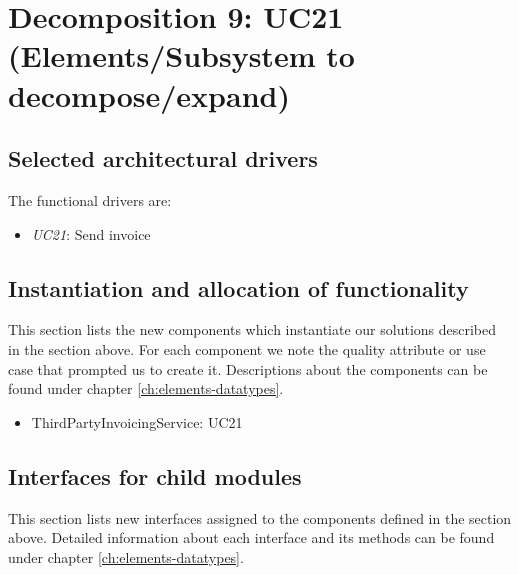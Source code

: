 \section{Decomposition 9: UC21 (Elements/Subsystem to decompose/expand)}


\subsection{Selected architectural drivers}
    The functional drivers are:
    \begin{itemize}
        \item \emph{UC21}: Send invoice
    \end{itemize}


\subsection{Instantiation and allocation of functionality}
    This section lists the new components which instantiate our solutions
    described in the section above. For each component we note the quality
    attribute or use case that prompted us to create it. Descriptions about
    the components can be found under chapter \ref{ch:elements-datatypes}. \\

    \begin{itemize}
        \item ThirdPartyInvoicingService: UC21
    \end{itemize}


\subsection{Interfaces for child modules}
    This section lists new interfaces assigned to the components defined
    in the section above. Detailed information about each interface and
    its methods can be found under chapter \ref{ch:elements-datatypes}.

